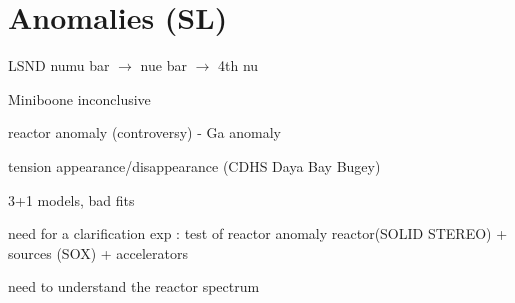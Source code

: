 \section{Anomalies (SL)}
\label{sec:anomalies}

LSND numu bar  $\rightarrow$ nue bar  $\rightarrow$ 4th nu

Miniboone inconclusive

reactor anomaly (controversy) - Ga anomaly

tension appearance/disappearance (CDHS Daya Bay Bugey)

3+1 models, bad fits

need for a clarification exp : test of reactor anomaly reactor(SOLID STEREO) + sources (SOX) + accelerators

need to understand the reactor spectrum
